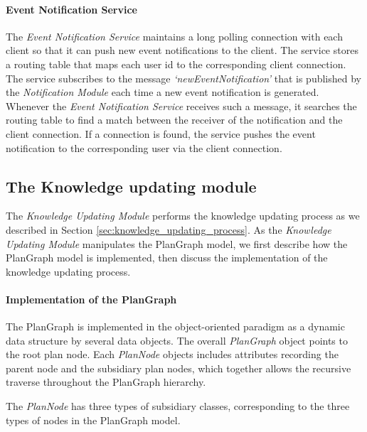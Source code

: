 \paragraph*{Event Notification Service} %
\label{par:event_notification_service}
The \emph{Event Notification Service} maintains a long polling connection with each client so that it can push new event notifications to the client. The service stores a routing table that maps each user id to the corresponding client connection. The service subscribes to the message \emph{`newEventNotification'} that is published by the \emph{Notification Module} each time a new event notification is generated. Whenever the \emph{Event Notification Service} receives such a message, it searches the routing table to find a match between the receiver of the notification and the client connection. If a connection is found, the service pushes the event notification to the corresponding user via the client connection. 

\subsection{The Knowledge updating module} %
\label{sub:the_knowledge_updating_module}
The \emph{Knowledge Updating Module} performs the knowledge updating process as we described in Section \ref{sec:knowledge_updating_process}. As the \emph{Knowledge Updating Module} manipulates the PlanGraph model, we first describe how the PlanGraph model is implemented, then discuss the implementation of the knowledge updating process.

\paragraph*{Implementation of the PlanGraph} %
\label{par:implementation_of_the_plangraph}
The PlanGraph is implemented in the object-oriented paradigm as a dynamic data structure by several data objects. The overall \emph{PlanGraph} object points to the root plan node. Each \emph{PlanNode} objects includes attributes recording the parent node and the subsidiary plan nodes, which together allows the recursive traverse throughout the PlanGraph hierarchy. 

The \emph{PlanNode} has three types of subsidiary classes, corresponding to the three types of nodes in the PlanGraph model.

